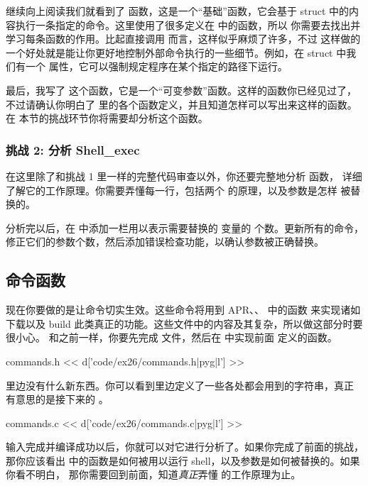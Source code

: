 继续向上阅读我们就看到了  函数，这是一个“基础”函数，它会基于  struct 
中的内容执行一条指定的命令。这里使用了很多定义在  中的函数，所以
你需要去找出并学习每条函数的作用。比起直接调用  而言，这样似乎麻烦了许多，不过
这样做的一个好处就是能让你更好地控制外部命令执行的一些细节。例如，在  struct 
中我们有一个  属性，它可以强制规定程序在某个指定的路径下运行。

最后，我写了  这个函数，它是一个“可变参数”函数。这样的函数你已经见过了，
不过请确认你明白了  里的各个函数定义，并且知道怎样可以写出来这样的函数。在
本节的挑战环节你将需要却分析这个函数。

\subsubsection{挑战 2: 分析 Shell\_exec}

在这里除了和挑战 1 里一样的完整代码审查以外，你还要完整地分析  函数，
详细了解它的工作原理。你需要弄懂每一行，包括两个  的原理，以及参数是怎样
被替换的。

分析完以后，在  中添加一栏用以表示需要替换的  变量的
个数。更新所有的命令，修正它们的参数个数，然后添加错误检查功能，以确认参数被正确替换。

\subsection{命令函数}

现在你要做的是让命令切实生效。这些命令将用到 APR、、 中的函数
来实现诸如下载以及 build 此类真正的功能。这些文件中的内容及其复杂，所以做这部分时要很小心。
和之前一样，你要先完成  文件，然后在  中实现前面
定义的函数。

\begin{code}{commands.h}
<< d['code/ex26/commands.h|pyg|l'] >>
\end{code}

 里边没有什么新东西。你可以看到里边定义了一些各处都会用到的字符串，真正
有意思的是接下来的 。

\begin{code}{commands.c}
<< d['code/ex26/commands.c|pyg|l'] >>
\end{code}

输入完成并编译成功以后，你就可以对它进行分析了。如果你完成了前面的挑战，那你应该看出
 中的函数是如何被用以运行 shell，以及参数是如何被替换的。如果你看不明白，
那你需要回到前面，知道\emph{真正}弄懂  的工作原理为止。



